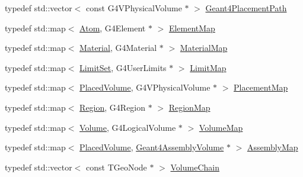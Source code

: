 \begin{DoxyCompactItemize}
\item 
typedef std\+::vector$<$ const G4\+V\+Physical\+Volume $\ast$ $>$ \hyperlink{namespace_d_d4hep_1_1_simulation_1_1_geant4_geometry_maps_a8a325934adb143cb1cbc47dd030395ed}{Geant4\+Placement\+Path}
\item 
typedef std\+::map$<$ \hyperlink{class_d_d4hep_1_1_geometry_1_1_atom}{Atom}, G4\+Element $\ast$ $>$ \hyperlink{namespace_d_d4hep_1_1_simulation_1_1_geant4_geometry_maps_a175b532b796e7de3d9128c1f0e1ee406}{Element\+Map}
\item 
typedef std\+::map$<$ \hyperlink{class_d_d4hep_1_1_geometry_1_1_material}{Material}, G4\+Material $\ast$ $>$ \hyperlink{namespace_d_d4hep_1_1_simulation_1_1_geant4_geometry_maps_a0ae377c64e684c47bd3045a9d3d8e248}{Material\+Map}
\item 
typedef std\+::map$<$ \hyperlink{class_d_d4hep_1_1_geometry_1_1_limit_set}{Limit\+Set}, G4\+User\+Limits $\ast$ $>$ \hyperlink{namespace_d_d4hep_1_1_simulation_1_1_geant4_geometry_maps_a338013d6709b82358b8e2490cdba0ed2}{Limit\+Map}
\item 
typedef std\+::map$<$ \hyperlink{class_d_d4hep_1_1_geometry_1_1_placed_volume}{Placed\+Volume}, G4\+V\+Physical\+Volume $\ast$ $>$ \hyperlink{namespace_d_d4hep_1_1_simulation_1_1_geant4_geometry_maps_a587c0a02d3847f03e6427093c90e93d2}{Placement\+Map}
\item 
typedef std\+::map$<$ \hyperlink{class_d_d4hep_1_1_geometry_1_1_region}{Region}, G4\+Region $\ast$ $>$ \hyperlink{namespace_d_d4hep_1_1_simulation_1_1_geant4_geometry_maps_afb7f77d7599fee831bfb2341123e8377}{Region\+Map}
\item 
typedef std\+::map$<$ \hyperlink{class_d_d4hep_1_1_geometry_1_1_volume}{Volume}, G4\+Logical\+Volume $\ast$ $>$ \hyperlink{namespace_d_d4hep_1_1_simulation_1_1_geant4_geometry_maps_a85199a23e6a837678c8e5d5f902fb2e2}{Volume\+Map}
\item 
typedef std\+::map$<$ \hyperlink{class_d_d4hep_1_1_geometry_1_1_placed_volume}{Placed\+Volume}, \hyperlink{class_d_d4hep_1_1_simulation_1_1_geant4_assembly_volume}{Geant4\+Assembly\+Volume} $\ast$ $>$ \hyperlink{namespace_d_d4hep_1_1_simulation_1_1_geant4_geometry_maps_ae1f67e315dd299b17e4ea1c58a47b312}{Assembly\+Map}
\item 
typedef std\+::vector$<$ const T\+Geo\+Node $\ast$ $>$ \hyperlink{namespace_d_d4hep_1_1_simulation_1_1_geant4_geometry_maps_a23aa6ab8c70ef8f0c800d00db6a7bb53}{Volume\+Chain}
\item 

\end{DoxyCompactItemize}
